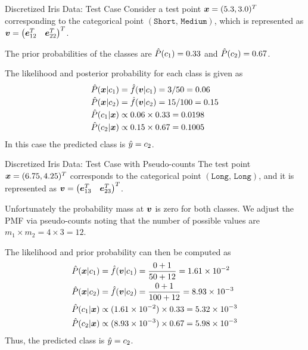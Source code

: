 \begin{frame}{Discretized Iris Data: Test Case}
 Consider a test point ${\boldsymbol x}=(5.3,3.0)^T$ corresponding to
    the categorical
    point $(\texttt{Short, Medium})$, which is represented as
    ${\boldsymbol v} = \begin{pmatrix} {\boldsymbol e}_{12}^T & {\boldsymbol e}_{22}^T \end{pmatrix}^T$.

	\medskip
The prior probabilities of the classes are $\hat{P}(c_1) = 0.33$ and $\hat{P}(c_2) = 0.67$.

 The likelihood
    and posterior probability for each class is given as
    \begin{align*}
        \hat{P}({\boldsymbol x}|c_1) & = \kern3pt\hat{\kern-3pt f}({\boldsymbol v}|c_1) = 3/50 = 0.06\\[-2pt]
        \hat{P}({\boldsymbol x}|c_2) & = \kern3pt\hat{\kern-3pt f}({\boldsymbol v}|c_2) = 15/100 = 0.15\\[-2pt]
        \hat{P}(c_1|{\boldsymbol x}) & \propto 0.06 \times 0.33 = 0.0198\\[-2pt]
        \hat{P}(c_2|{\boldsymbol x}) & \propto 0.15 \times 0.67 = 0.1005
    \end{align*}
    In this case the predicted class is $\hat{y} = c_2$.
\end{frame}


\begin{frame}{Discretized Iris Data: Test Case with Pseudo-counts}
    The test point ${\boldsymbol x}=(6.75,4.25)^T$
    corresponds to the categorical
    point $(\texttt{Long, Long})$, and it is represented as
    ${\boldsymbol v} = \begin{pmatrix} {\boldsymbol e}_{13}^T & {\boldsymbol e}_{23}^T \end{pmatrix}^T$. 
	
\medskip
	Unfortunately the
    probability mass at ${\boldsymbol v}$ is zero for both classes.
    We adjust the PMF via pseudo-counts noting that the number 
	of possible
    values are $m_1 \times m_2 = 4 \times 3 = 12$.

	\medskip
    The likelihood and prior probability
    can then be computed as
    \begin{align*}
        \hat{P}({\boldsymbol x}|c_1) & = \kern3pt\hat{\kern-3pt f}({\boldsymbol v}|c_1) = {0+1\over 50+12} = 1.61
        \times 10^{-2}\\
        \hat{P}({\boldsymbol x}|c_2) & = \kern3pt\hat{\kern-3pt f}({\boldsymbol v}|c_2) = {0+1 \over 100+12} =
        8.93 \times 10^{-3}\\
        \hat{P}(c_1|{\boldsymbol x}) & \propto (1.61 \times 10^{-2}) \times 0.33 =
        5.32 \times 10^{-3}\\
        \hat{P}(c_2|{\boldsymbol x}) & \propto (8.93 \times 10^{-3}) \times 0.67 =
        5.98 \times 10^{-3}
    \end{align*}
    Thus, the predicted class is $\hat{y} = c_2$.
  \end{frame}


